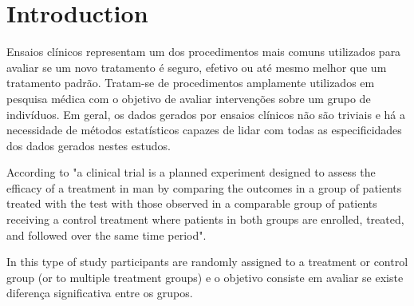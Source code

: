 \documentclass[AMA,STIX1COL]{WileyNJD-v2}
\begin{document}


\maketitle



\section{Introduction}\label{sec1}


Ensaios clínicos representam um dos procedimentos mais comuns utilizados para avaliar se um novo tratamento é seguro, efetivo ou até mesmo melhor que um tratamento padrão. Tratam-se de procedimentos amplamente utilizados em pesquisa médica com o objetivo de avaliar intervenções sobre um grupo de indivíduos. Em geral, os dados gerados por ensaios clínicos não são triviais  e há a necessidade de métodos estatísticos capazes de lidar com todas as especificidades dos dados gerados nestes estudos.

According to \cite{meinert1986clinical} "a clinical trial is a planned experiment designed to assess the efficacy of a treatment in man by comparing the outcomes in a group of patients treated with the test with those observed in a comparable group of patients receiving a control treatment where patients in both groups are enrolled, treated, and followed over the same time period".

In this type of study participants are randomly assigned to a treatment or control group (or to multiple treatment groups) \cite{hannan2008randomized} e o objetivo consiste em avaliar se existe diferença significativa entre os grupos.
\end{document}
